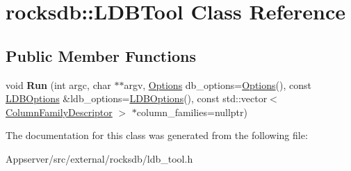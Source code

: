 \hypertarget{classrocksdb_1_1LDBTool}{}\section{rocksdb\+:\+:L\+D\+B\+Tool Class Reference}
\label{classrocksdb_1_1LDBTool}
\subsection*{Public Member Functions}
\begin{DoxyCompactItemize}
\item 
void {\bfseries Run} (int argc, char $\ast$$\ast$argv, \hyperlink{structrocksdb_1_1Options}{Options} db\+\_\+options=\hyperlink{structrocksdb_1_1Options}{Options}(), const \hyperlink{structrocksdb_1_1LDBOptions}{L\+D\+B\+Options} \&ldb\+\_\+options=\hyperlink{structrocksdb_1_1LDBOptions}{L\+D\+B\+Options}(), const std\+::vector$<$ \hyperlink{structrocksdb_1_1ColumnFamilyDescriptor}{Column\+Family\+Descriptor} $>$ $\ast$column\+\_\+families=nullptr)\hypertarget{classrocksdb_1_1LDBTool_ab9a6f4487ad6f89a483cf7f0aa70118c}{}\label{classrocksdb_1_1LDBTool_ab9a6f4487ad6f89a483cf7f0aa70118c}

\end{DoxyCompactItemize}


The documentation for this class was generated from the following file\+:\begin{DoxyCompactItemize}
\item 
Appserver/src/external/rocksdb/ldb\+\_\+tool.\+h\end{DoxyCompactItemize}
